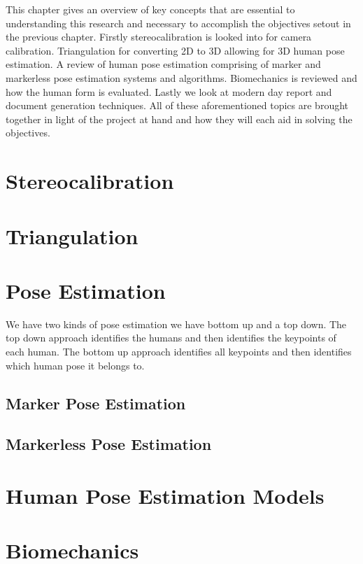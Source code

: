 \label{chap:literaturereview}

This chapter gives an overview of key concepts that are essential to understanding this research and necessary to accomplish the objectives setout in the previous chapter. Firstly stereocalibration is looked into for camera calibration. Triangulation for converting 2D to 3D allowing for 3D human pose estimation. A review of human pose estimation comprising of marker and markerless pose estimation systems and algorithms. Biomechanics is reviewed and how the human form is evaluated. Lastly we look at modern day report and document generation techniques.
All of these aforementioned topics are brought together in light of the project at hand and how they will each aid in solving the objectives.

\section{Stereocalibration}

\section{Triangulation}

\section{Pose Estimation}

We have two kinds of pose estimation we have bottom up and a top down.
The top down approach identifies the humans and then identifies the keypoints of each human.
The bottom up approach identifies all keypoints and then identifies which human pose it belongs to.

\subsection{Marker Pose Estimation}
\subsection{Markerless Pose Estimation}

\section{Human Pose Estimation Models}
\section{Biomechanics}

